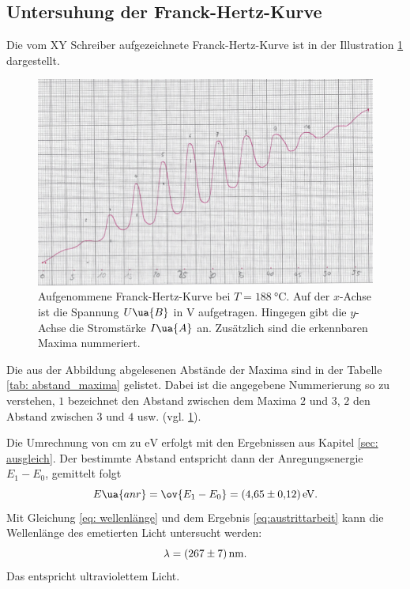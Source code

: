 \subsection{Untersuhung der Franck-Hertz-Kurve}\label{sec: frank}
\FloatBarrier
Die vom XY Schreiber aufgezeichnete Franck-Hertz-Kurve ist in der Illustration \ref{fig: messkurve_frank_hertz} dargestellt.
\begin{figure}
  \centering
  \includegraphics[width=0.8 \textwidth]{./pics/frank_hertz_kurve.png}
  \caption{Aufgenommene Franck-Hertz-Kurve bei $T=\SI{188}{\celsius}$. Auf der $x$-Achse ist die Spannung $U\ua{B}$ in $\si{\volt}$ aufgetragen.
          Hingegen gibt die $y$-Achse die Stromstärke $I\ua{A}$ an. Zusätzlich sind die erkennbaren Maxima nummeriert.}
  \label{fig: messkurve_frank_hertz}
\end{figure}
Die aus der Abbildung abgelesenen Abstände der Maxima sind in der Tabelle \ref{tab: abstand_maxima} gelistet.
Dabei ist die angegebene Nummerierung so zu verstehen, $1$ bezeichnet den Abstand zwischen dem Maxima $2$ und $3$, $2$ den Abstand zwischen $3$ und $4$ usw. (vgl. \ref{fig: messkurve_frank_hertz}).

Die Umrechnung von $\si{\centi\meter}$ zu $\si{\eV}$ erfolgt mit den Ergebnissen aus Kapitel \ref{sec: ausgleich}.
Der bestimmte Abstand entspricht dann der Anregungsenergie $E_1-E_0$, gemittelt folgt
\begin{equation}
  \label{eq:austrittarbeit}
E\ua{anr}=\ov{E_1-E_0}=\SI{4.65\pm0.12}{\eV}.
\end{equation}
Mit Gleichung \eqref{eq: wellenlänge} und dem Ergebnis \eqref{eq:austrittarbeit} kann die Wellenlänge des emetierten Licht untersucht werden:
\begin{equation}
  \label{eq: lambda}
  \lambda=\SI{267\pm7}{\nano\meter}.
\end{equation}
Das entspricht ultraviolettem Licht.

